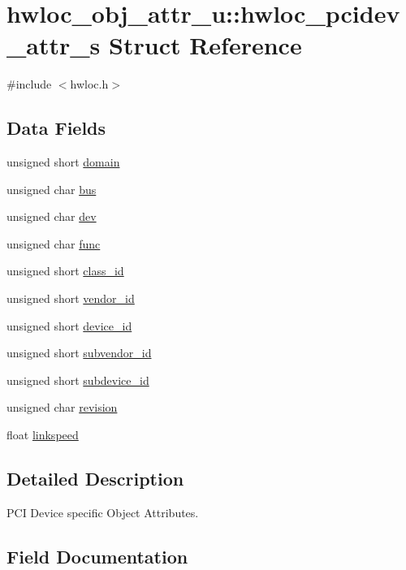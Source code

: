 \hypertarget{a00262}{}\section{hwloc\+\_\+obj\+\_\+attr\+\_\+u\+:\+:hwloc\+\_\+pcidev\+\_\+attr\+\_\+s Struct Reference}
\label{a00262}


{\ttfamily \#include $<$hwloc.\+h$>$}

\subsection*{Data Fields}
\begin{DoxyCompactItemize}
\item 
unsigned short \hyperlink{a00262_a8fba44988deb98613c1505a4019a34dc}{domain}
\item 
unsigned char \hyperlink{a00262_aae99e035e8d1387d7b8768aaa8eceb0a}{bus}
\item 
unsigned char \hyperlink{a00262_a3d70c84a12f7e93d14c8d47bf4fd9dc5}{dev}
\item 
unsigned char \hyperlink{a00262_a695f32df53f4ef728670bfcf31b74e0f}{func}
\item 
unsigned short \hyperlink{a00262_aee735352d9f1686fd290fc6d6397c334}{class\+\_\+id}
\item 
unsigned short \hyperlink{a00262_aad970ad19b62eb2d5df30e4802da4f4c}{vendor\+\_\+id}
\item 
unsigned short \hyperlink{a00262_a35b66064ab7d768caf7154e410caf0fa}{device\+\_\+id}
\item 
unsigned short \hyperlink{a00262_a499db3d8cc89eaba04fcaef3df1cba97}{subvendor\+\_\+id}
\item 
unsigned short \hyperlink{a00262_acac741aecd7a6db64f33409427e3971f}{subdevice\+\_\+id}
\item 
unsigned char \hyperlink{a00262_a13ad54c93d08d8ac808e4de9674c5ee7}{revision}
\item 
float \hyperlink{a00262_a59b2fce35f7cbde86c4fd305d0ccda5f}{linkspeed}
\end{DoxyCompactItemize}


\subsection{Detailed Description}
P\+CI Device specific Object Attributes. 

\subsection{Field Documentation}
\mbox{\label{a00262_aae99e035e8d1387d7b8768aaa8eceb0a}} 
